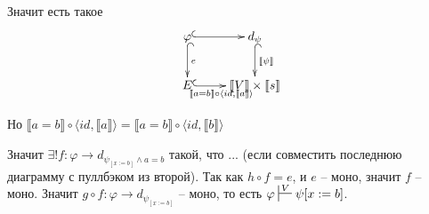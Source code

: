 \documentclass[draft]{article}
\begin{document}
\begin{enumerate}
Значит есть такое
\[
\xymatrix{
\varphi  \ar@{^{(}->}[r]\ar@{^{(}->}[d]^{e} & d_\psi \ar@{^{(}->}[d]^{\llbracket \psi \rrbracket} \\
E \ar@{^{(}->}[r]_{\llbracket a = b \rrbracket \circ \langle id, \llbracket a \rrbracket \rangle} & \llbracket V\rrbracket \times \llbracket s\rrbracket
}
\]

Но $ \llbracket a = b \rrbracket \circ \langle id, \llbracket a \rrbracket \rangle = \llbracket a = b \rrbracket \circ  \langle id, \llbracket b \rrbracket \rangle$

Значит $\exists! f : \varphi \to d_{\psi_{[x := b]} \land a=b}$ такой, что ... (если совместить последнюю диаграмму с пуллбэком из второй). Так как $h \circ  f = e$, и $e$ -- моно, значит $f$ -- моно. Значит $g \circ f : \varphi \to d_{\psi_{[x := b]}}$  -- моно, то есть $\varphi \sststile{}{V} \psi[x := b]$.

\end{enumerate}
\end{document}
